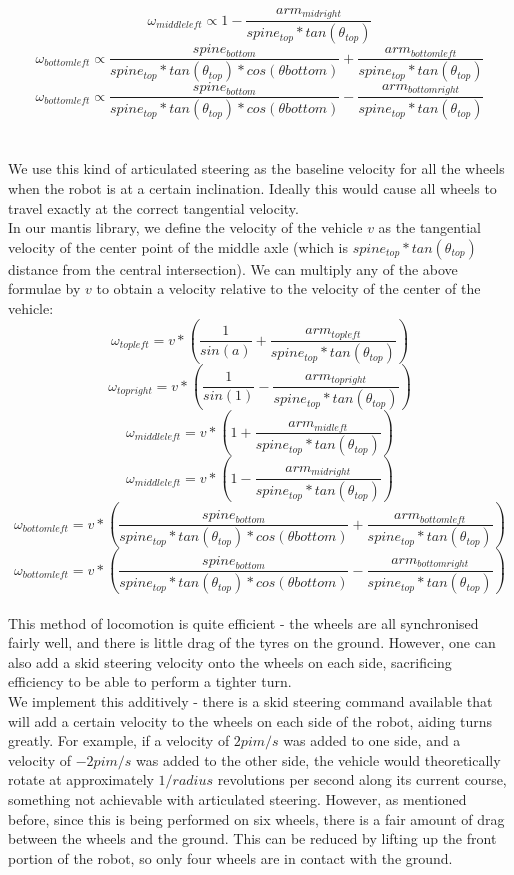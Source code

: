 \documentclass[]{article}
\begin{document}
\[ \omega_{middleleft} \propto 1 - \frac{arm_{midright}}{spine_{top} * tan(\theta_{top})} \]
\[ \omega_{bottomleft} \propto \frac{spine_{bottom}}{spine_{top} * tan(\theta_{top}) * cos(\theta{bottom})} + \frac{arm_{bottomleft}}{spine_{top} * tan(\theta_{top})} \]
\[ \omega_{bottomleft} \propto \frac{spine_{bottom}}{spine_{top} * tan(\theta_{top}) * cos(\theta{bottom})} - \frac{arm_{bottomright}}{spine_{top} * tan(\theta_{top})} \]
\\
\\
We use this kind of articulated steering as the baseline velocity for all the wheels when the robot is at a certain inclination. Ideally this would cause all wheels to travel exactly at the correct tangential velocity.
\\
In our mantis library, we define the velocity of the vehicle $v$ as the tangential velocity of the center point of the middle axle (which is $spine_{top} * tan(\theta_{top})$ distance from the central intersection). We can multiply any of the above formulae by $v$ to obtain a velocity relative to the velocity of the center of the vehicle:
\\
\[ \omega_{topleft} = v * (\frac{1}{sin(a)} + \frac{arm_{topleft}}{spine_{top} * tan(\theta_{top})}) \]
\[ \omega_{topright} = v * (\frac{1}{sin(1)} - \frac{arm_{topright}}{spine_{top} * tan(\theta_{top})}) \]
\[ \omega_{middleleft} = v * (1 + \frac{arm_{midleft}}{spine_{top} * tan(\theta_{top})}) \]
\[ \omega_{middleleft} = v * (1 - \frac{arm_{midright}}{spine_{top} * tan(\theta_{top})}) \]
\[ \omega_{bottomleft} = v * (\frac{spine_{bottom}}{spine_{top} * tan(\theta_{top}) * cos(\theta{bottom})} + \frac{arm_{bottomleft}}{spine_{top} * tan(\theta_{top})}) \]
\[ \omega_{bottomleft} = v * (\frac{spine_{bottom}}{spine_{top} * tan(\theta_{top}) * cos(\theta{bottom})} - \frac{arm_{bottomright}}{spine_{top} * tan(\theta_{top})}) \]
\\
This method of locomotion is quite efficient - the wheels are all synchronised fairly well, and there is little drag of the tyres on the ground. However, one can also add a skid steering velocity onto the wheels on each side, sacrificing efficiency to be able to perform a tighter turn.
\\
We implement this additively - there is a skid steering command available that will add a certain velocity to the wheels on each side of the robot, aiding turns greatly. For example, if a velocity of $2pi m/s$ was added to one side, and a velocity of $-2pi m/s$ was added to the other side, the vehicle would theoretically rotate at approximately $1 / radius$ revolutions per second along its current course, something not achievable with articulated steering. However, as mentioned before, since this is being performed on six wheels, there is a fair amount of drag between the wheels and the ground. This can be reduced by lifting up the front portion of the robot, so only four wheels are in contact with the ground.
\end{document}
